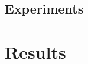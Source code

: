 \documentclass[conference]{IEEEtran}
\begin{document}
	
	
	





	


\subsection{Experiments} \label{Experiments}



\section{Results} \label{Results}





\end{document}
